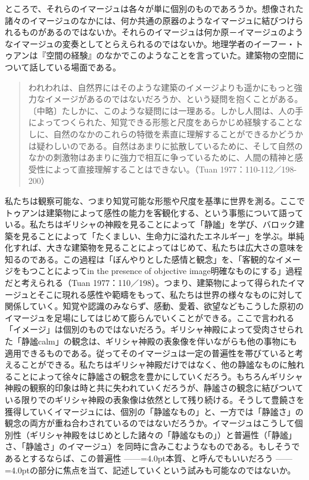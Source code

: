 \documentclass[b5j,twoside,twocolumn]{utarticle}
\begin{document}
ところで、それらのイマージュは各々が単に個別のものであろうか。想像された諸々のイマージュのなかには、何か共通の原器のようなイマージュに結びつけられるものがあるのではないか。それらのイマージュは何か原－イマージュのようなイマージュの変奏としてとらえられるのではないか。地理学者のイーフー・トゥアンは『空間の経験』のなかでこのようなことを言っていた。建築物の空間について話している場面である。
\begin{quote}
われわれは、自然界にはそのような建築のイメージよりも遥かにもっと強力なイメージがあるのではないだろうか、という疑問を抱くことがある。〔中略〕たしかに、このような疑問には一理ある。しかし人間は、人の手によってつくられた、知覚できる形態と尺度をあらかじめ経験することなしに、自然のなかのこれらの特徴を素直に理解することができるかどうかは疑わしいのである。自然はあまりに拡散しているために、そして自然のなかの刺激物はあまりに強力で相互に争っているために、人間の精神と感受性によって直接理解することはできない。（Tuan 1977：110-112／198-200）
\end{quote}


私たちは観察可能な、つまり知覚可能な形態や尺度を基準に世界を測る。ここでトゥアンは建築物によって感性の能力を客観化する、という事態について語っている。私たちはギリシャの神殿を見ることによって「静謐」を学び、バロック建築を見ることによって「たくましい、生命力に溢れたエネルギー」を学ぶ。単純化すれば、大きな建築物を見ることによってはじめて、私たちは広大さの意味を知るのである。この過程は「ぼんやりとした感情と観念」を、「客観的なイメージをもつことによってin the presence of objective image明確なものにする」過程だと考えられる（Tuan 1977：110／198）。つまり、建築物によって得られたイマージュとそこに現れる感性や範疇をもって、私たちは世界の様々なものに対して関係していく。知覚や認識のみならず、感動、愛着、欲望などもこうした原初のイマージュを足場にしてはじめて膨らんでいくことができる。ここで言われる「イメージ」は個別のものではないだろう。ギリシャ神殿によって受肉させられた「静謐calm」の観念は、ギリシャ神殿の表象像を伴いながらも他の事物にも適用できるものである。従ってそのイマージュは一定の普遍性を帯びていると考えることができる。私たちはギリシャ神殿だけではなく、他の静謐なものに触れることによって徐々に静謐さの観念を豊かにしていくだろう。もちろんギリシャ神殿の観察的印象は時と共に失われていくだろうが、静謐さの観念に結びついている限りでのギリシャ神殿の表象像は依然として残り続ける。そうして豊饒さを獲得していくイマージュには、個別の「静謐なもの」と、一方では「静謐さ」の観念の両方が重ね合わされているのではないだろうか。イマージュはこうして個別性（ギリシャ神殿をはじめとした諸々の「静謐なもの」）と普遍性（「静謐」さ、「静謐さ」のイマージュ）を同時に含みこむようなものである。もしそうであるとするならば、この普遍性\tbaselineshift =2.5pt ------\tbaselineshift =4.0pt本質、と呼んでもいいだろう\tbaselineshift =2.5pt ------\tbaselineshift =4.0ptの部分に焦点を当て、記述していくという試みも可能なのではないか。
\end{document}
